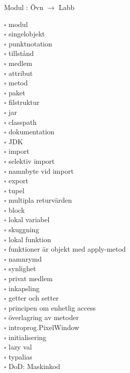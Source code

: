 
    Modul : Övn  $\rightarrow$ Labb 
    \begin{multicols}{3}\SlideFontTiny
    $\square$ modul \\
$\square$ singelobjekt \\
$\square$ punktnotation \\
$\square$ tillstånd \\
$\square$ medlem \\
$\square$ attribut \\
$\square$ metod \\
$\square$ paket \\
$\square$ filstruktur \\
$\square$ jar \\
$\square$ classpath \\
$\square$ dokumentation \\
$\square$ JDK \\
$\square$ import \\
$\square$ selektiv import \\
$\square$ namnbyte vid import \\
$\square$ export \\
$\square$ tupel \\
$\square$ multipla returvärden \\
$\square$ block \\
$\square$ lokal variabel \\
$\square$ skuggning \\
$\square$ lokal funktion \\
$\square$ funktioner är objekt med apply-metod \\
$\square$ namnrymd \\
$\square$ synlighet \\
$\square$ privat medlem \\
$\square$ inkapsling \\
$\square$ getter och setter \\
$\square$ principen om enhetlig access \\
$\square$ överlagring av metoder \\
$\square$ introprog.PixelWindow \\
$\square$ initialisering \\
$\square$ lazy val \\
$\square$ typalias \\
$\square$ DoD: Maskinkod \\
    \end{multicols}
    
